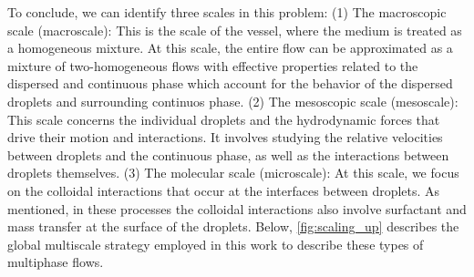 To conclude, we can identify three scales in this problem:
(1) The macroscopic scale (macroscale): This is the scale of the vessel, where the medium is treated as a homogeneous mixture. 
At this scale, the entire flow can be approximated as a mixture of two-homogeneous flows with effective properties related to the dispersed and continuous phase which account for the behavior of the dispersed droplets and surrounding continuos phase.
(2) The mesoscopic scale (mesoscale): This scale concerns the individual droplets and the hydrodynamic forces that drive their motion and interactions. It involves studying the relative velocities between droplets and the continuous phase, as well as the interactions between droplets themselves.
(3) The molecular scale (microscale): At this scale, we focus on the colloidal interactions that occur at the interfaces between droplets. 
As mentioned, in these processes the colloidal interactions also involve surfactant and mass transfer at the surface of the droplets.
Below, \ref{fig:scaling_up} describes the global multiscale strategy employed in this work to describe these types of multiphase flows.
